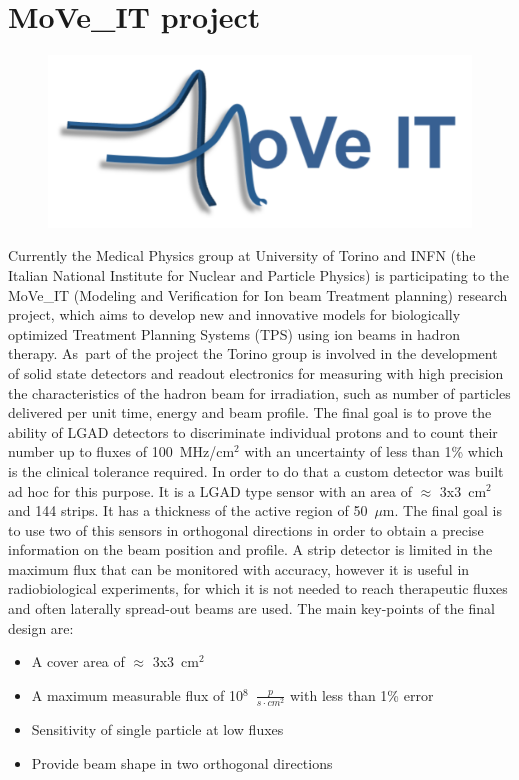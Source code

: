 \section{MoVe\_IT project}\label{moveit}
\begin{figure}[H]
	\centering
	\includegraphics[width=0.35\linewidth]{IMG/ch2/Move_IT_logo}
\end{figure}
\noindent Currently the Medical Physics group at University of Torino and INFN (the Italian National Institute for
Nuclear and Particle Physics) is participating to the MoVe\_IT\cite{moveit} (Modeling and Verification for Ion beam Treatment planning)
research project, which aims to develop new and
innovative models for biologically optimized Treatment Planning Systems (TPS) using ion beams in hadron therapy.
As~part of the project the Torino group is involved in the development of solid state detectors and readout electronics for measuring with high precision
the characteristics of the hadron beam for irradiation, such as number of particles delivered per unit time, energy and beam profile.
The final goal is to prove the ability of LGAD detectors to discriminate individual protons and to count their number up to fluxes of 100~MHz/cm$^2$ with an uncertainty of less than 1\% which is the clinical tolerance required.
In order to do that a custom detector was built ad hoc for this purpose. It is a LGAD type sensor with an area of $\approx$ 3x3~cm$^2$ and 144 strips. It has a thickness of the active region of 50~$\mu$m.
The final goal is to use two of this sensors in orthogonal directions in order to obtain a precise information on the beam position and profile.
A strip detector is limited in the maximum flux that can be monitored with accuracy, however it is useful in radiobiological experiments, for which it is not needed to reach therapeutic fluxes and often laterally spread-out beams are used\cite{hammad}.
The main key-points of the final design are:
\begin{itemize}
	\item A cover area of $\approx$ 3x3~cm$^2$
	\item A maximum measurable flux of 10$^8$~$\frac{p}{s \cdot cm^2}$ with less than 1\% error
	\item Sensitivity of single particle at low fluxes
	\item Provide beam shape in two orthogonal directions
\end{itemize}



